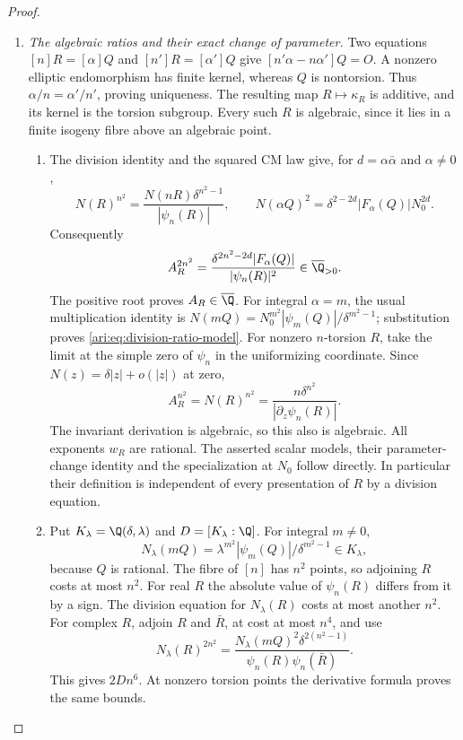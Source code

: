 \begin{proof}\leavevmode\par


 
\begin{enumerate}[label=\arabic*.,leftmargin=0pt,labelsep=.5em]
\item \emph{The algebraic ratios and their exact change of parameter.}
Two equations $[n]R=[\alpha]Q$ and $[n']R=[\alpha']Q$
give $[n'\alpha-n\alpha']Q=O$. A nonzero elliptic endomorphism
has finite kernel, whereas $Q$ is nontorsion. Thus
$\alpha/n=\alpha'/n'$, proving uniqueness. The resulting
map $R\mapsto\kappa_R$ is additive, and its kernel is the
torsion subgroup. Every such $R$ is algebraic, since it lies
in a finite isogeny fibre above an algebraic point.


\begin{enumerate}[label=(\alph*),leftmargin=1.3em,labelsep=.5em]
\item  The division identity and the squared CM law give, for
$d=\alpha\bar\alpha$ and $\alpha\ne0$,
\[
 N(R)^{n^2}=\frac{N(nR)\delta^{n^2-1}}{|\psi_n(R)|},
 \qquad
 N(\alpha Q)^2=\delta^{2-2d}|F_\alpha(Q)|N_0^{2d}.
\]
Consequently
\[
 A_R^{2n^2}=\frac{\delta^{2n^2-2d}|F_\alpha(Q)|}
                         {|\psi_n(R)|^2}\in\overline\Q_{>0}.
\]
The positive root proves $A_R\in\overline\Q$. For integral
$\alpha=m$, the usual multiplication identity is
$N(mQ)=N_0^{m^2}|\psi_m(Q)|/\delta^{m^2-1}$;
substitution proves \eqref{ari:eq:division-ratio-model}.
For nonzero $n$-torsion $R$, take the limit at the simple zero
of $\psi_n$ in the uniformizing coordinate. Since
$N(z)=\delta|z|+o(|z|)$ at zero,
\[
 A_R^{n^2}=N(R)^{n^2}
       =\frac{n\delta^{n^2}}{|\partial_z\psi_n(R)|}.
\]
The invariant derivation is algebraic, so this also is algebraic.
All exponents $w_R$ are rational. The asserted scalar models,
their parameter-change identity and the specialization at $N_0$
follow directly. In particular their definition is independent
of every presentation of $R$ by a division equation.


\item  Put $K_\lambda=\Q(\delta,\lambda)$ and
$D=[K_\lambda:\Q]$. For integral $m\ne0$,
\[
 N_\lambda(mQ)=\lambda^{m^2}
                     |\psi_m(Q)|/\delta^{m^2-1}\in K_\lambda,
\]
because $Q$ is rational. The fibre of $[n]$ has $n^2$ points,
so adjoining $R$ costs at most $n^2$. For real $R$ the absolute
value of $\psi_n(R)$ differs from it by a sign. The division
equation for $N_\lambda(R)$ costs at most another $n^2$.
For complex $R$, adjoin $R$ and $\bar R$, at cost at most
$n^4$, and use
\[
 N_\lambda(R)^{2n^2}
 =\frac{N_\lambda(mQ)^2\delta^{2(n^2-1)}}
              {\psi_n(R)\psi_n(\bar R)}.
\]
This gives $2Dn^6$. At nonzero torsion points the derivative
formula proves the same bounds.


\end{enumerate}
\end{enumerate}
\end{proof}
